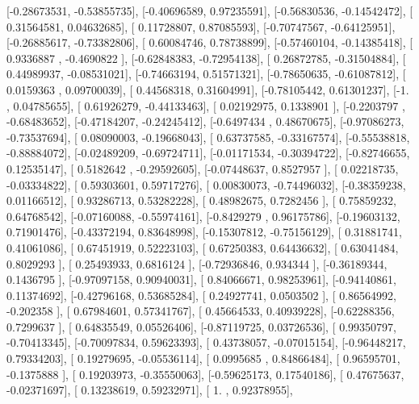 \documentclass{article}
\begin{document}
       [-0.28673531, -0.53855735],
       [-0.40696589,  0.97235591],
       [-0.56830536, -0.14542472],
       [ 0.31564581,  0.04632685],
       [ 0.11728807,  0.87085593],
       [-0.70747567, -0.64125951],
       [-0.26885617, -0.73382806],
       [ 0.60084746,  0.78738899],
       [-0.57460104, -0.14385418],
       [ 0.9336887 , -0.4690822 ],
       [-0.62848383, -0.72954138],
       [ 0.26872785, -0.31504884],
       [ 0.44989937, -0.08531021],
       [-0.74663194,  0.51571321],
       [-0.78650635, -0.61087812],
       [ 0.0159363 ,  0.09700039],
       [ 0.44568318,  0.31604991],
       [-0.78105442,  0.61301237],
       [-1.        ,  0.04785655],
       [ 0.61926279, -0.44133463],
       [ 0.02192975,  0.1338901 ],
       [-0.2203797 , -0.68483652],
       [-0.47184207, -0.24245412],
       [-0.6497434 ,  0.48670675],
       [-0.97086273, -0.73537694],
       [ 0.08090003, -0.19668043],
       [ 0.63737585, -0.33167574],
       [-0.55538818, -0.88884072],
       [-0.02489209, -0.69724711],
       [-0.01171534, -0.30394722],
       [-0.82746655,  0.12535147],
       [ 0.5182642 , -0.29592605],
       [-0.07448637,  0.8527957 ],
       [ 0.02218735, -0.03334822],
       [ 0.59303601,  0.59717276],
       [ 0.00830073, -0.74496032],
       [-0.38359238,  0.01166512],
       [ 0.93286713,  0.53282228],
       [ 0.48982675,  0.7282456 ],
       [ 0.75859232,  0.64768542],
       [-0.07160088, -0.55974161],
       [-0.8429279 ,  0.96175786],
       [-0.19603132,  0.71901476],
       [-0.43372194,  0.83648998],
       [-0.15307812, -0.75156129],
       [ 0.31881741,  0.41061086],
       [ 0.67451919,  0.52223103],
       [ 0.67250383,  0.64436632],
       [ 0.63041484,  0.8029293 ],
       [ 0.25493933,  0.6816124 ],
       [-0.72936846,  0.934344  ],
       [-0.36189344,  0.1436795 ],
       [-0.97097158,  0.90940031],
       [ 0.84066671,  0.98253961],
       [-0.94140861,  0.11374692],
       [-0.42796168,  0.53685284],
       [ 0.24927741,  0.0503502 ],
       [ 0.86564992, -0.202358  ],
       [ 0.67984601,  0.57341767],
       [ 0.45664533,  0.40939228],
       [-0.62288356,  0.7299637 ],
       [ 0.64835549,  0.05526406],
       [-0.87119725,  0.03726536],
       [ 0.99350797, -0.70413345],
       [-0.70097834,  0.59623393],
       [ 0.43738057, -0.07015154],
       [-0.96448217,  0.79334203],
       [ 0.19279695, -0.05536114],
       [ 0.0995685 ,  0.84866484],
       [ 0.96595701, -0.1375888 ],
       [ 0.19203973, -0.35550063],
       [-0.59625173,  0.17540186],
       [ 0.47675637, -0.02371697],
       [ 0.13238619,  0.59232971],
       [ 1.        ,  0.92378955],
\end{document}
